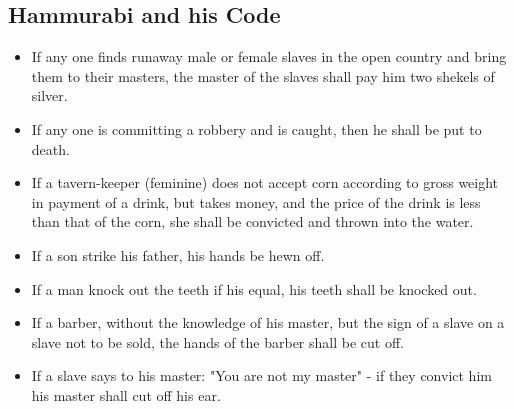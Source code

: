 \documentclass[11pt]{article}
\begin{document}
\subsection{Hammurabi and his Code}
\label{sec-3-5}
\begin{itemize}
\item If any one finds runaway male or female slaves in the open country and bring them to their masters, the master of the slaves shall pay him two shekels of silver.

\item If any one is committing a robbery and is caught, then he shall be put to death.

\item If a tavern-keeper (feminine) does not accept corn according to gross weight in payment of a drink, but takes money, and the price of the drink is less than that of the corn, she shall be convicted and thrown into the water.

\item If a son strike his father, his hands be hewn off.

\item If a man knock out the teeth if his equal, his teeth shall be knocked out.

\item If a barber, without the knowledge of his master, but the sign of a slave on a slave not to be sold, the hands of the barber shall be cut off.

\item If a slave says to his master: "You are not my master" - if they convict him his master shall cut off his ear.
\end{itemize}
\end{document}
